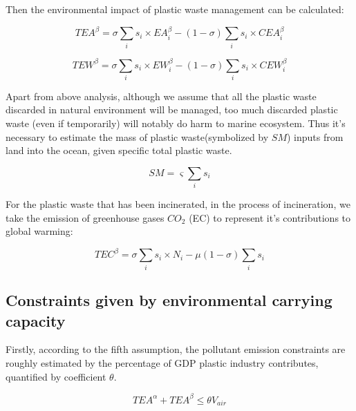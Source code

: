 \documentclass{mcmthesis}
\begin{document}
Then the environmental impact of plastic waste management can be calculated:

\begin{equation}
TEA^\beta = \sigma\sum_i{s_i}\times EA_i^\beta - (1 - \sigma)\sum_i{s_i}\times CEA_i^\beta
\label{EAB}
\end{equation}

\begin{equation}
TEW^\beta = \sigma\sum_i{s_i}\times EW_i^\beta - (1 - \sigma)\sum_i{s_i}\times CEW_i^\beta
\label{EWB}
\end{equation}


Apart from above analysis, although we assume that all the plastic waste discarded in natural environment will be managed, too much discarded plastic waste (even if temporarily) will notably do harm to marine ecosystem\cite{LI}. Thus it’s necessary to estimate the mass of plastic waste(symbolized by $SM$) inputs from land into the ocean, given specific total plastic waste.

\begin{equation}
SM = \varsigma\sum_i{s_i}
\label{SM}
\end{equation}


For the plastic waste that has been incinerated, in the process of incineration, we take the emission of greenhouse gases $CO_2$ (EC) to represent it’s contributions to global warming:

\begin{equation}
TEC^\beta = \sigma\sum_{i}s_i\times N_i - \mu(1 - \sigma)\sum_is_i
\end{equation}

\subsection{Constraints given by environmental carrying capacity}

Firstly, according to the fifth assumption, the pollutant emission constraints are roughly estimated by the percentage of GDP plastic industry contributes, quantified by coefficient $\theta$.

\begin{equation}
TEA^\alpha + TEA^\beta \le \theta V_{air}
\label{air}
\end{equation}
\end{document}
